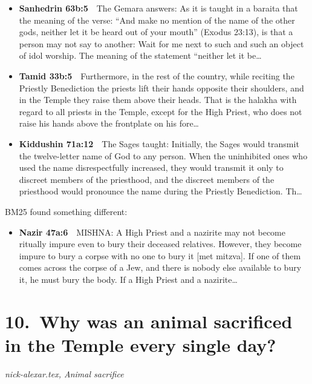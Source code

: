 \documentclass[11pt,a4paper]{article}
\begin{document}
\begin{itemize}[leftmargin=1.2em,itemsep=3pt]
\item {\color{ref}\textbf{Sanhedrin 63b:5}}\ \ The Gemara answers: As it is taught in a baraita that the meaning of the verse: “And make no mention of the name of the other gods, neither let it be heard out of your mouth” (Exodus 23:13), is that a person may not say to another: Wait for me next to such and such an object of idol worship. The meaning of the statement “neither let it be\ldots
\item {\color{ref}\textbf{Tamid 33b:5}}\ \ Furthermore, in the rest of the country, while reciting the Priestly Benediction the priests lift their hands opposite their shoulders, and in the Temple they raise them above their heads. That is the halakha with regard to all priests in the Temple, except for the High Priest, who does not raise his hands above the frontplate on his fore\ldots
\item {\color{ref}\textbf{Kiddushin 71a:12}}\ \ The Sages taught: Initially, the Sages would transmit the twelve-letter name of God to any person. When the uninhibited ones who used the name disrespectfully increased, they would transmit it only to discreet members of the priesthood, and the discreet members of the priesthood would pronounce the name during the Priestly Benediction. Th\ldots
\end{itemize}
{\color{quiet}\small BM25 found something different:}
\begin{itemize}[leftmargin=1.2em]
\item {\color{ref}\textbf{Nazir 47a:6}}\ \ MISHNA: A High Priest and a nazirite may not become ritually impure even to bury their deceased relatives. However, they become impure to bury a corpse with no one to bury it [met mitzva]. If one of them comes across the corpse of a Jew, and there is nobody else available to bury it, he must bury the body. If a High Priest and a nazirite\ldots
\end{itemize}

\section*{10.\ Why was an animal sacrificed in the Temple every single day?}
{\color{quiet}\small\textit{nick-alexar.tex, Animal sacrifice}}
\end{document}
